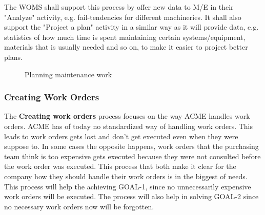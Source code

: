 The WOMS shall support this process by offer new data to M/E in their "Analyze" activity, e.g. fail-tendencies for different machineries. It shall also support the "Project a plan" activity in a similar way as it will provide data, e.g. statistics of how much time is spent maintaining certain systems/equipment, materials that is usually needed and so on, to make it easier to project better plans.
\begin{figure}[H]
	\centering
	\setlength\fboxsep{7pt}
	\setlength\fboxrule{0.5pt}
	\label{fig:planning}
	\caption{Planning maintenance work}
\end{figure}
%
\subsubsection{Creating Work Orders}
\label{sec:bp2}
The \textbf{Creating work orders} process focuses on the way ACME handles work orders. ACME has of today no standardized way of handling work orders. This leads to work orders gets lost and don't get executed even when they were suppose to. In some cases the opposite happens, work orders that the purchasing team think is too expensive gets executed because they were not consulted before the work order was executed. This process that both make it clear for the company how they should handle their work orders is in the biggest of needs. This process will help the achieving GOAL-1, since no unnecessarily expensive work orders will be executed. The process will also help in solving GOAL-2 since no necessary work orders now will be forgotten. 

